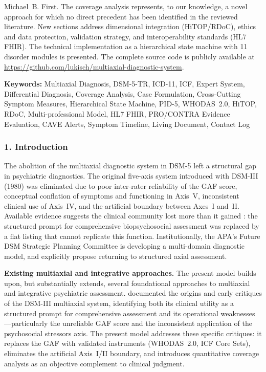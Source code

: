 \documentclass[11pt,a4paper]{article}
\begin{document}
Michael~B. First. The coverage analysis represents, to our knowledge, a novel approach for which no direct precedent has been identified in the reviewed literature. New sections address dimensional integration (HiTOP/RDoC), ethics and data protection, validation strategy, and interoperability standards (HL7 FHIR). The technical implementation as a hierarchical state machine with 11 disorder modules is presented. The complete source code is publicly available at \url{https://github.com/lukisch/multiaxial-diagnostic-system}.

\textbf{Keywords:} Multiaxial Diagnosis, DSM-5-TR, ICD-11, ICF, Expert System, Differential Diagnosis, Coverage Analysis, Case Formulation, Cross-Cutting Symptom Measures, Hierarchical State Machine, PID-5, WHODAS~2.0, HiTOP, RDoC, Multi-professional Model, HL7 FHIR, PRO/CONTRA Evidence Evaluation, CAVE Alerts, Symptom Timeline, Living Document, Contact Log

\subsubsection*{1. Introduction}

The abolition of the multiaxial diagnostic system in DSM-5 left a structural gap in psychiatric diagnostics. The original five-axis system introduced with DSM-III (1980) was eliminated due to poor inter-rater reliability of the GAF score, conceptual conflation of symptoms and functioning in Axis~V, inconsistent clinical use of Axis~IV, and the artificial boundary between Axes~I and~II. Available evidence suggests the clinical community lost more than it gained \citep{Kress2014, Probst2014}: the structured prompt for comprehensive biopsychosocial assessment was replaced by a flat listing that cannot replicate this function. Institutionally, the APA's Future DSM Strategic Planning Committee is developing a multi-domain diagnostic model, and \citet{ErlichFirst2025} explicitly propose returning to structured axial assessment.

\textbf{Existing multiaxial and integrative approaches.} The present model builds upon, but substantially extends, several foundational approaches to multiaxial and integrative psychiatric assessment. \citet{Williams1985} documented the origins and early critiques of the DSM-III multiaxial system, identifying both its clinical utility as a structured prompt for comprehensive assessment and its operational weaknesses---particularly the unreliable GAF score and the inconsistent application of the psychosocial stressors axis. The present model addresses these specific critiques: it replaces the GAF with validated instruments (WHODAS~2.0, ICF Core Sets), eliminates the artificial Axis~I/II boundary, and introduces quantitative coverage analysis as an objective complement to clinical judgment.
\end{document}
